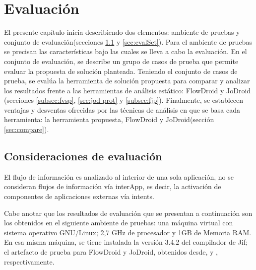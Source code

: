\chapter{Evaluación}
\label{ch:evaluacion}
El presente capítulo inicia describiendo dos elementos: ambiente de pruebas y
conjunto de evaluación(secciones \ref{sec:consi-eval} y
\ref{sec:evalSet}).\newline
Para el ambiente de pruebas se precisan las características bajo las cuales se lleva a cabo la evaluación. En el conjunto de
evaluación, se describe un grupo de casos de prueba que permite evaluar la
propuesta de solución planteada.\newline
Teniendo el conjunto de casos de prueba, se evalúa la herramienta de solución
propuesta para comparar y analizar los resultados frente a las herramientas de
análisis estático: FlowDroid y JoDroid (secciones \ref{subsec:fvsp}, \ref{sec:jod-prot} y
\ref{subsec:fjp}).\newline
Finalmente, se establecen ventajas y desventas ofrecidas por las técnicas de
análisis en que se basa cada herramienta: la herramienta propuesta, FlowDroid y
JoDroid(sección \ref{sec:compare}).


\section{Consideraciones de evaluación}
\label{sec:consi-eval}
El flujo de información es analizado al interior de una sola aplicación, no se
consideran flujos de información vía interApp, es decir, la activación de
componentes de aplicaciones externas vía intents.

Cabe anotar que los resultados de evaluación que se presentan a continuación son
los obtenidos en el siguiente ambiente de pruebas: una máquina virtual con
sistema operativo GNU/Linux; 2,7 GHz de procesador y 1GB de Memoria RAM. En esa
misma máquina, se tiene instalada la versión 3.4.2 del compilador de Jif;
el artefacto de prueba para FlowDroid y JoDroid, obtenidos desde,
\cite{FlowDroid-artifact} y \cite{joDroidManual}, respectivamente.



